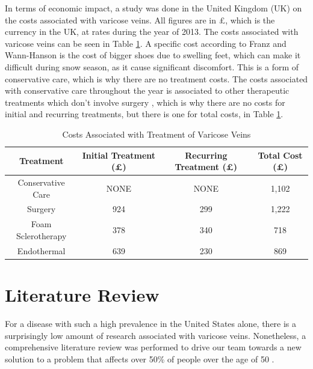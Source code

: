 \documentclass[11.5pt]{article}
\begin{document}
In terms of economic impact, a study was done in the United Kingdom (UK) on the costs associated with varicose veins. All figures are in \pounds, which is the currency in the UK, at rates during the year of 2013. The costs associated with varicose veins can be seen in Table \ref{tab:Costs}. A specific cost according to Franz and Wann-Hanson is the cost of bigger shoes due to swelling feet, which can make it difficult during snow season, as it cause significant discomfort. This is a form of conservative care, which is why there are no treatment costs. The costs associated with conservative care throughout the year is associated to other therapeutic treatments which don't involve surgery \cite{UK}, which is why there are no costs for initial and recurring treatments, but there is one for total costs, in Table \ref{tab:Costs}.

\begin{table}[H]
    \centering
    \caption{Costs Associated with Treatment of Varicose Veins \cite{UK}}
    \vspace{3mm}
    \begin{tabular}{cccc}
    \hline
         Treatment & Initial Treatment (\pounds) & Recurring Treatment (\pounds) & Total Cost (\pounds)\\
         \hline
         Conservative Care & NONE & NONE & 1,102\\
         Surgery & 924 & 299 & 1,222\\
         Foam Sclerotherapy & 378 & 340 & 718 \\
         Endothermal & 639 & 230 & 869\\
    \hline
    \end{tabular}
        \label{tab:Costs}
\end{table}

\section{Literature Review}
For a disease with such a high prevalence in the United States alone, there is a surprisingly low amount of research associated with varicose veins. Nonetheless, a comprehensive literature review was performed to drive our team towards a new solution to a problem that affects over 50\% of people over the age of 50 \cite{Sell}.
\end{document}
